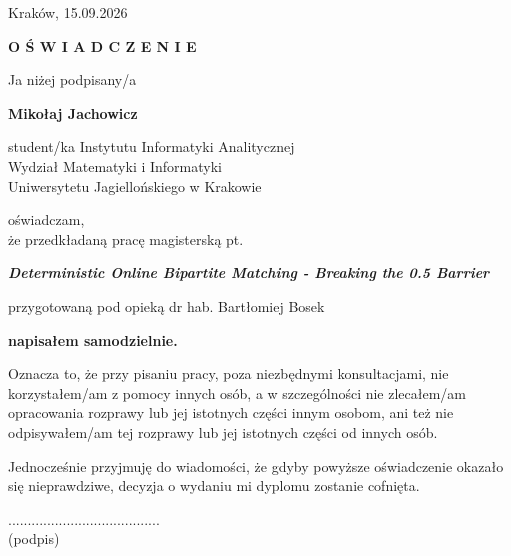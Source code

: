 \newpage\thispagestyle{empty}
\newpage\thispagestyle{empty}
\hfill Kraków, 15.09.2026\par\vspace{1cm}\par
\centerline{{\Large \bf O Ś W I A D C Z E N I E}}
\par\vspace{1.4cm}\par
Ja niżej podpisany/a
\begin{center}
{\sc \bf Mikołaj Jachowicz}
\end{center}
\begin{center}
{\large student/ka Instytutu Informatyki Analitycznej\\
Wydział Matematyki i Informatyki\\
Uniwersytetu Jagiellońskiego w Krakowie
}\par\vspace{0.6cm}\par
oświadczam,\\

że przedkładaną pracę magisterską pt.

\end{center}
\par
\begin{center}
{\sc \sl \large \bf Deterministic Online Bipartite Matching - Breaking the 0.5 Barrier}
\end{center}

\begin{center}
    {\large przygotowaną pod opieką dr hab. Bartłomiej Bosek}\par\vspace{0.4cm}\par
    {\bf napisałem samodzielnie.}
\end{center}
\par\vspace{0.6cm}\par

Oznacza to, że przy pisaniu pracy, poza niezbędnymi konsultacjami, nie korzystałem/am z pomocy innych osób, a w szczególności nie zlecałem/am opracowania rozprawy lub jej istotnych części innym osobom, ani też nie odpisywałem/am tej rozprawy lub jej istotnych części od innych osób.
\par
Jednocześnie przyjmuję do wiadomości, że gdyby powyższe oświadczenie okazało się nieprawdziwe, decyzja o wydaniu mi dyplomu zostanie cofnięta.
\par\vspace{2cm}\par
\begin{flushright}
....................................... \ \ \ \ \ \ \\
{\scriptsize (podpis)\hspace{2.3cm}\ }
\end{flushright}